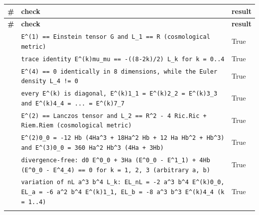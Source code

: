 \documentclass[10pt,a4paper]{article}
\begin{document}
{\footnotesize
\begin{longtable}{>{\raggedright\arraybackslash}p{}>{\raggedright\arraybackslash}p{}>{\raggedright\arraybackslash}p{}}
\toprule
\textbf{\#} & \textbf{check} & \textbf{result} \\
\midrule\endfirsthead
\toprule
\textbf{\#} & \textbf{check} & \textbf{result} \\
\midrule\endhead
\endfoot
\bottomrule\endlastfoot
221 & \texttt{E\textasciicircum{}(1) == Einstein tensor G and L\_\allowbreak{}1 == R (cosmological metric)} & True \\
222 & \texttt{trace identity E\textasciicircum{}(k)mu\_\allowbreak{}mu == -((8-2k)/\allowbreak{}2) L\_\allowbreak{}k for k = 0..4} & True \\
223 & \texttt{E\textasciicircum{}(4) == 0 identically in 8 dimensions, while the Euler density L\_\allowbreak{}4 != 0} & True \\
224 & \texttt{every E\textasciicircum{}(k) is diagonal, E\textasciicircum{}(k)1\_\allowbreak{}1 = E\textasciicircum{}(k)2\_\allowbreak{}2 = E\textasciicircum{}(k)3\_\allowbreak{}3 and E\textasciicircum{}(k)4\_\allowbreak{}4 = ... = E\textasciicircum{}(k)7\_\allowbreak{}7} & True \\
225 & \texttt{E\textasciicircum{}(2) == Lanczos tensor and L\_\allowbreak{}2 == R\textasciicircum{}2 - 4 Ric.Ric + Riem.Riem (cosmological metric)} & True \\
226 & \texttt{E\textasciicircum{}(2)0\_\allowbreak{}0 = -12 Hb (4Ha\textasciicircum{}3 + 18Ha\textasciicircum{}2 Hb + 12 Ha Hb\textasciicircum{}2 + Hb\textasciicircum{}3) and E\textasciicircum{}(3)0\_\allowbreak{}0 = 360 Ha\textasciicircum{}2 Hb\textasciicircum{}3 (4Ha + 3Hb)} & True \\
227 & \texttt{divergence-free: d0 E\textasciicircum{}0\_\allowbreak{}0 + 3Ha (E\textasciicircum{}0\_\allowbreak{}0 - E\textasciicircum{}1\_\allowbreak{}1) + 4Hb (E\textasciicircum{}0\_\allowbreak{}0 - E\textasciicircum{}4\_\allowbreak{}4) == 0 for k = 1, 2, 3 (arbitrary a, b)} & True \\
228 & \texttt{variation of nL a\textasciicircum{}3 b\textasciicircum{}4 L\_\allowbreak{}k: EL\_\allowbreak{}nL = -2 a\textasciicircum{}3 b\textasciicircum{}4 E\textasciicircum{}(k)0\_\allowbreak{}0, EL\_\allowbreak{}a = -6 a\textasciicircum{}2 b\textasciicircum{}4 E\textasciicircum{}(k)1\_\allowbreak{}1, EL\_\allowbreak{}b = -8 a\textasciicircum{}3 b\textasciicircum{}3 E\textasciicircum{}(k)4\_\allowbreak{}4 (k = 1..4)} & True \\*
\end{longtable}}
\end{document}
